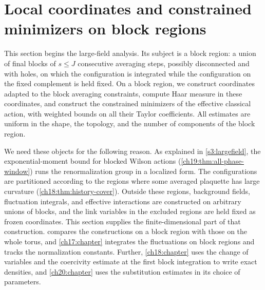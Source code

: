\chapter{Local coordinates and constrained minimizers on block regions}\label{ch15:chapter}

This section begins the large-field analysis. Its subject is a block region: a union of final blocks of $s\le J$ consecutive averaging steps, possibly disconnected and with holes, on which the configuration is integrated while the configuration on the fixed complement is held fixed. On a block region, we construct coordinates adapted to the block averaging constraints, compute Haar measure in these coordinates, and construct the constrained minimizers of the effective classical action, with weighted bounds on all their Taylor coefficients. All estimates are uniform in the shape, the topology, and the number of components of the block region.

We need these objects for the following reason. As explained in \cref{s3:largefield}, the exponential-moment bound for blocked Wilson actions (\cref{ch19:thm:all-phase-window}) runs the renormalization group in a localized form. The configurations are partitioned according to the regions where some averaged plaquette has large curvature (\cref{ch18:thm:history-cover}). Outside these regions, background fields, fluctuation integrals, and effective interactions are constructed on arbitrary unions of blocks, and the link variables in the excluded regions are held fixed as frozen coordinates. This section supplies the finite-dimensional part of that construction.  compares the constructions on a block region with those on the whole torus, and \cref{ch17:chapter} integrates the fluctuations on block regions and tracks the normalization constants. Further, \cref{ch18:chapter} uses the change of variables and the coercivity estimate at the first block integration to write exact densities, and \cref{ch20:chapter} uses the substitution estimates in its choice of parameters.

